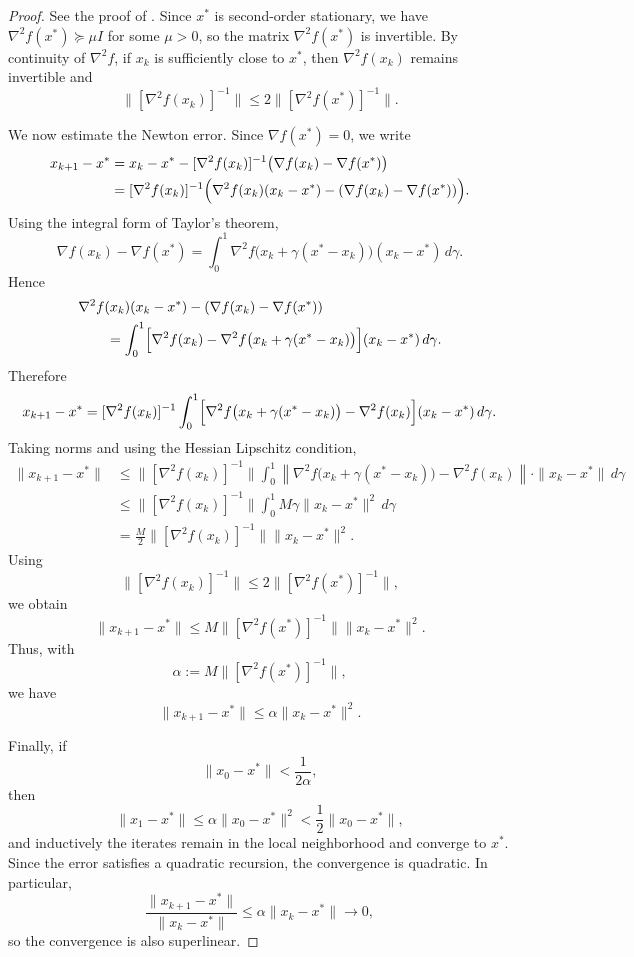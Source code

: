 \begin{proof}
See the proof of \cite[Theorem 3.5]{NocedalWrightNumericalOptimization}. Since $x^*$ is second-order stationary, we have $\nabla^2 f(x^*) \succeq \mu I$ for some $\mu>0$, so the matrix $\nabla^2 f(x^*)$ is invertible.
By continuity of $\nabla^2 f$, if $x_k$ is sufficiently close to $x^*$, then $\nabla^2 f(x_k)$
remains invertible and
\[
\|[\nabla^2 f(x_k)]^{-1}\|
\le
2\|[\nabla^2 f(x^*)]^{-1}\|.
\]

We now estimate the Newton error. Since $\nabla f(x^*)=0$, we write
\begin{align*}
x_{k+1}-x^*
&=
x_k-x^*-[\nabla^2 f(x_k)]^{-1}\bigl(\nabla f(x_k)-\nabla f(x^*)\bigr) \\
&=
[\nabla^2 f(x_k)]^{-1}
\Bigl(
\nabla^2 f(x_k)(x_k-x^*)
-
(\nabla f(x_k)-\nabla f(x^*))
\Bigr).
\end{align*}
Using the integral form of Taylor's theorem,
\[
\nabla f(x_k)-\nabla f(x^*)
=
\int_0^1
\nabla^2 f\bigl(x_k+\gamma(x^*-x_k)\bigr)(x_k-x^*)\,d\gamma.
\]
Hence
\begin{align*}
&\nabla^2 f(x_k)(x_k-x^*)
-
(\nabla f(x_k)-\nabla f(x^*)) \\
&\qquad
=
\int_0^1
\Bigl[
\nabla^2 f(x_k)
-
\nabla^2 f\bigl(x_k+\gamma(x^*-x_k)\bigr)
\Bigr](x_k-x^*)\,d\gamma.
\end{align*}
Therefore
\begin{align*}
x_{k+1}-x^*
=
[\nabla^2 f(x_k)]^{-1}
\int_0^1
\Bigl[
\nabla^2 f\bigl(x_k+\gamma(x^*-x_k)\bigr)-\nabla^2 f(x_k)
\Bigr](x_k-x^*)\,d\gamma.
\end{align*}
Taking norms and using the Hessian Lipschitz condition,
\begin{align*}
\|x_{k+1}-x^*\|
&\le
\|[\nabla^2 f(x_k)]^{-1}\|
\int_0^1
\left\|
\nabla^2 f\bigl(x_k+\gamma(x^*-x_k)\bigr)-\nabla^2 f(x_k)
\right\|
\cdot
\|x_k-x^*\|\,d\gamma \\
&\le
\|[\nabla^2 f(x_k)]^{-1}\|
\int_0^1
M\gamma\|x_k-x^*\|^2\,d\gamma \\
&=
\frac{M}{2}\|[\nabla^2 f(x_k)]^{-1}\|\|x_k-x^*\|^2.
\end{align*}
Using
\[
\|[\nabla^2 f(x_k)]^{-1}\|
\le
2\|[\nabla^2 f(x^*)]^{-1}\|,
\]
we obtain
\[
\|x_{k+1}-x^*\|
\le
M\|[\nabla^2 f(x^*)]^{-1}\|\|x_k-x^*\|^2.
\]
Thus, with
\[
\alpha:=M\|[\nabla^2 f(x^*)]^{-1}\|,
\]
we have
\[
\|x_{k+1}-x^*\|
\le
\alpha \|x_k-x^*\|^2.
\]

Finally, if
\[
\|x_0-x^*\|<\frac{1}{2\alpha},
\]
then
\[
\|x_1-x^*\|
\le
\alpha\|x_0-x^*\|^2
<
\frac12\|x_0-x^*\|,
\]
and inductively the iterates remain in the local neighborhood and converge to $x^*$.
Since the error satisfies a quadratic recursion, the convergence is quadratic. In particular,
\[
\frac{\|x_{k+1}-x^*\|}{\|x_k-x^*\|}
\le
\alpha \|x_k-x^*\| \to 0,
\]
so the convergence is also superlinear.

\end{proof}


